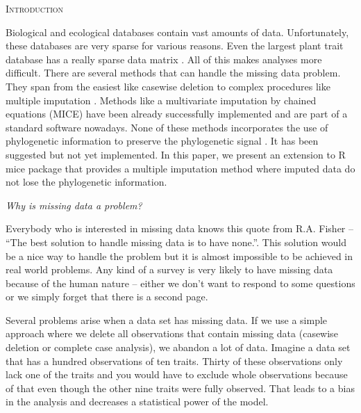 \documentclass[hidelinks,a4paper]{article}
\renewcommand{\section}[1]{%
\bigskip
\begin{center}
\begin{Large}
\normalfont\scshape #1
\medskip
\end{Large}
\end{center}}
\renewcommand{\subsection}[1]{%
\bigskip
\begin{center}
\begin{large}
\normalfont\itshape #1
\end{large}
\end{center}}
\begin{document}
\begin{multicols}{2}
\section{Introduction}
Biological and ecological databases contain vast amounts of data. Unfortunately, these databases are very sparse for various reasons. Even the largest plant trait database has a really sparse data matrix \cite{kattge2011try}. All of this makes analyses more difficult. There are several methods that can handle the missing data problem. They span from the easiest like casewise deletion \cite{allison2001missing} to complex procedures like multiple imputation \cite{allison2001missing,miRubin}. Methods like a multivariate imputation by chained equations (MICE) have been already successfully implemented \cite{Buuren2011} and are part of a standard software nowadays. None of these methods incorporates the use of phylogenetic information to preserve the phylogenetic signal \cite{blomberg2003testing}. It has been suggested \cite{swenson2014phylogenetic,Garland2000} but not yet implemented. In this paper, we present an extension to R mice package \cite{Buuren2011} that provides a multiple imputation method where imputed data do not lose the phylogenetic information.

\subsection{Why is missing data a problem?}
Everybody who is interested in missing data knows this quote from R.A. Fisher -- ``The best solution to handle missing data is to have none.''. This solution would be a nice way to handle the problem but it is almost impossible to be achieved in real world problems. Any kind of a survey is very likely to have missing data because of the human nature -- either we don't want to respond to some questions or we simply forget that there is a second page.

Several problems arise when a data set has missing data. If we use a simple approach where we delete all observations that contain missing data (casewise deletion or complete case analysis), we abandon a lot of data. Imagine a data set that has a hundred observations of ten traits. Thirty of these observations only lack one of the traits and you would have to exclude whole observations because of that even though the other nine traits were fully observed. That leads to a bias in the analysis and decreases a statistical power of the model.


\end{multicols}
\end{document}
